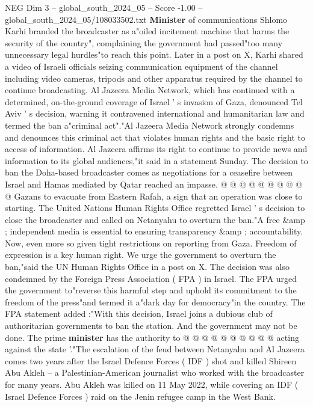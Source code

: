 \begin{textsample}{NEG Dim 3 – global\_south\_2024\_05 – Score -1.00 – global\_south\_2024\_05/108033502.txt}  \label{ex:f3_neg_366}
\textbf{Minister} of communications Shlomo Karhi branded the broadcaster as a"oiled incitement machine that harms the security of the country", complaining the government had passed"too many unnecessary legal hurdles"to reach this point.
Later in a post on X, Karhi shared a video of Israeli officials seizing communication equipment of the channel including video cameras, tripods and other apparatus required by the channel to continue broadcasting.
Al Jazeera Media Network, which has continued with a determined, on-the-ground coverage of Israel ' s invasion of Gaza, denounced Tel Aviv ' s decision, warning it contravened international and humanitarian law and termed the ban a"criminal act"."Al Jazeera Media Network strongly condemns and denounces this criminal act that violates human rights and the basic right to access of information.
Al Jazeera affirms its right to continue to provide news and information to its global audiences,"it said in a statement Sunday.
The decision to ban the Doha-based broadcaster comes as negotiations for a ceasefire between Israel and Hamas mediated by Qatar reached an impasse. @ @ @ @ @ @ @ @ @ @ Gazans to evacuate from Eastern Rafah, a sign that an operation was close to starting.
The United Nations Human Rights Office regretted Israel ' s decision to close the broadcaster and called on Netanyahu to overturn the ban."A free \&amp ; independent media is essential to ensuring transparency \&amp ; accountability.
Now, even more so given tight restrictions on reporting from Gaza.
Freedom of expression is a key human right.
We urge the government to overturn the ban,"said the UN Human Rights Office in a post on X.
The decision was also condemned by the Foreign Press Association ( FPA ) in Israel.
The FPA urged the government to"reverse this harmful step and uphold its commitment to the freedom of the press"and termed it a"dark day for democracy"in the country.
The FPA statement added :"With this decision, Israel joins a dubious club of authoritarian governments to ban the station.
And the government may not be done.
The prime \textbf{minister} has the authority to @ @ @ @ @ @ @ @ @ @ acting against the state '."The escalation of the feud between Netanyahu and Al Jazeera comes two years after the Israel Defence Forces ( IDF ) shot and killed Shireen Abu Akleh -- a Palestinian-American journalist who worked with the broadcaster for many years.
Abu Akleh was killed on 11 May 2022, while covering an IDF ( Israel Defence Forces ) raid on the Jenin refugee camp in the West Bank.

\end{textsample}
